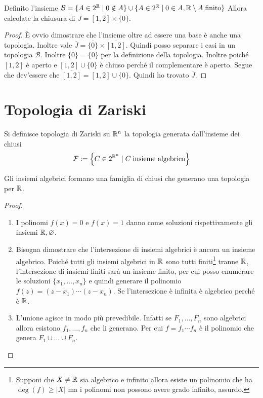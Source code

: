 \begin{theorem}
	Definito l'insieme $\mathcal{B} = \{A \in 2^{\mathbb{R}} \; | \; 0 \notin A \} \cup \{ A \in 2^{\mathbb{R}} \; | \; 0 \in A, \mathbb{R} \setminus A \; \text{finito} \}$ Allora calcolate la chiusura di $J = \left[1,2\right] \times \{0\}$.
\end{theorem}
\begin{proof}
	È ovvio dimostrare che l'insieme oltre ad essere una base è anche una topologia. Inoltre vale $\overline{J} = \overline{\{0\}} \times \overline{\left[1,2\right]}$. Quindi posso separare i casi in un topologia $\mathcal{B}$. Inoltre $\overline{\{0\}} = \{0\}$ per la definizione della topologia. Inoltre poiché $\left[1,2\right]$ è aperto e $\left[1,2\right] \cup \{0\}$ è chiuso perché il complementare è aperto. Segue che dev'essere che $\overline{\left[1,2\right]} = \left[1,2\right] \cup \{0\}$. Quindi ho trovato $\overline{J}$.
\end{proof}


\section{Topologia di Zariski}

\begin{definition}
	Si definisce topologia di Zariski su $\mathbb{R}^n$ la topologia generata dall'insieme dei chiusi 
	\begin{equation}
	\begin{aligned}
	\mathcal{F} := \left\{ C \in 2^{\mathbb{R}^n} \; | \; C \; \text{insieme algebrico} \right\}
	\end{aligned}
	\end{equation}
\end{definition}

\begin{theorem}
	Gli insiemi algebrici formano una famiglia di chiusi che generano una topologia per $\mathbb{R}$.
\end{theorem}
\begin{proof}
	\begin{enumerate}
		\item I polinomi $f(x) = 0$ e $f(x) = 1$ danno come soluzioni rispettivamente gli insiemi $\mathbb{R}, \varnothing$.
		\item Bisogna dimostrare che l'intersezione di insiemi algebrici è ancora un insieme algebrico. Poiché tutti gli insiemi algebrici in $\mathbb{R}$ sono tutti finiti\footnote{Supponi che $X \neq \mathbb{R}$ sia algebrico e infinito allora esiste un polinomio che ha $\deg(f) \ge |X|$ ma i polinomi non possono avere grado infinito, assurdo.} tranne $\mathbb{R}$, l'intersezione di insiemi finiti sarà un insieme finito, per cui posso enumerare le soluzioni $\{x_1, \dots, x_n\}$ e quindi generare il polinomio $f(z) = (z-x_1)\cdots(z-x_n)$. Se l'intersezione è infinita è algebrico perché è $\mathbb{R}$. 
		\item L'unione agisce in modo più prevedibile. Infatti se $F_1, \dots, F_n$ sono algebrici allora esistono $f_1, \dots, f_n$ che li generano. Per cui $f = f_1 \cdots f_n$ è il polinomio che genera $F_1 \cup \dots \cup F_n$.
	\end{enumerate}
\end{proof}

